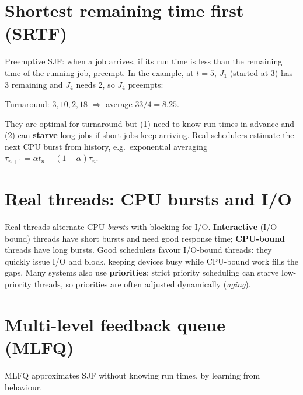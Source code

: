 \section{Shortest remaining time first (SRTF)}

Preemptive SJF: when a job arrives, if its run time is less than the remaining time of the
running job, preempt. In the example, at $t=5$, $J_1$ (started at 3) has 3 remaining and $J_4$
needs 2, so $J_4$ preempts:
\begin{center}
\end{center}
Turnaround: $3, 10, 2, 18$ $\Rightarrow$ average $33/4 = 8.25$.

\begin{important}
They are optimal for turnaround but (1) need to know run times in advance and (2) can
\textbf{starve} long jobs if short jobs keep arriving. Real schedulers estimate the next CPU
burst from history, e.g.\ exponential averaging $\tau_{n+1} = \alpha t_n + (1-\alpha)\tau_n$.
\end{important}

\section{Real threads: CPU bursts and I/O}

Real threads alternate CPU \emph{bursts} with blocking for I/O. \textbf{Interactive} (I/O-bound)
threads have short bursts and need good response time; \textbf{CPU-bound} threads have long bursts.
Good schedulers favour I/O-bound threads: they quickly issue I/O and block, keeping devices
busy while CPU-bound work fills the gaps. Many systems also use \textbf{priorities}; strict
priority scheduling can starve low-priority threads, so priorities are often adjusted
dynamically (\emph{aging}).

\section{Multi-level feedback queue (MLFQ)}

MLFQ approximates SJF without knowing run times, by learning from behaviour.

